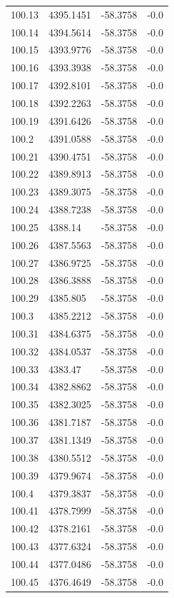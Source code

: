 \begin{table}[H]
\begin{tabular}{llll}
100.13 & 4395.1451 & -58.3758 & -0.0 \\
100.14 & 4394.5614 & -58.3758 & -0.0 \\
100.15 & 4393.9776 & -58.3758 & -0.0 \\
100.16 & 4393.3938 & -58.3758 & -0.0 \\
100.17 & 4392.8101 & -58.3758 & -0.0 \\
100.18 & 4392.2263 & -58.3758 & -0.0 \\
100.19 & 4391.6426 & -58.3758 & -0.0 \\
100.2 & 4391.0588 & -58.3758 & -0.0 \\
100.21 & 4390.4751 & -58.3758 & -0.0 \\
100.22 & 4389.8913 & -58.3758 & -0.0 \\
100.23 & 4389.3075 & -58.3758 & -0.0 \\
100.24 & 4388.7238 & -58.3758 & -0.0 \\
100.25 & 4388.14 & -58.3758 & -0.0 \\
100.26 & 4387.5563 & -58.3758 & -0.0 \\
100.27 & 4386.9725 & -58.3758 & -0.0 \\
100.28 & 4386.3888 & -58.3758 & -0.0 \\
100.29 & 4385.805 & -58.3758 & -0.0 \\
100.3 & 4385.2212 & -58.3758 & -0.0 \\
100.31 & 4384.6375 & -58.3758 & -0.0 \\
100.32 & 4384.0537 & -58.3758 & -0.0 \\
100.33 & 4383.47 & -58.3758 & -0.0 \\
100.34 & 4382.8862 & -58.3758 & -0.0 \\
100.35 & 4382.3025 & -58.3758 & -0.0 \\
100.36 & 4381.7187 & -58.3758 & -0.0 \\
100.37 & 4381.1349 & -58.3758 & -0.0 \\
100.38 & 4380.5512 & -58.3758 & -0.0 \\
100.39 & 4379.9674 & -58.3758 & -0.0 \\
100.4 & 4379.3837 & -58.3758 & -0.0 \\
100.41 & 4378.7999 & -58.3758 & -0.0 \\
100.42 & 4378.2161 & -58.3758 & -0.0 \\
100.43 & 4377.6324 & -58.3758 & -0.0 \\
100.44 & 4377.0486 & -58.3758 & -0.0 \\
100.45 & 4376.4649 & -58.3758 & -0.0 \\

\end{tabular}
\end{table}

